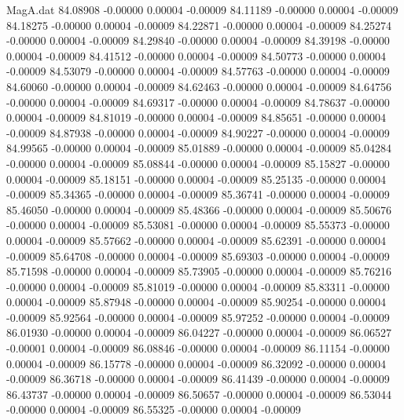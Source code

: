 \begin{filecontents}{MagA.dat}
  84.08908   -0.00000    0.00004   -0.00009
  84.11189   -0.00000    0.00004   -0.00009
  84.18275   -0.00000    0.00004   -0.00009
  84.22871   -0.00000    0.00004   -0.00009
  84.25274   -0.00000    0.00004   -0.00009
  84.29840   -0.00000    0.00004   -0.00009
  84.39198   -0.00000    0.00004   -0.00009
  84.41512   -0.00000    0.00004   -0.00009
  84.50773   -0.00000    0.00004   -0.00009
  84.53079   -0.00000    0.00004   -0.00009
  84.57763   -0.00000    0.00004   -0.00009
  84.60060   -0.00000    0.00004   -0.00009
  84.62463   -0.00000    0.00004   -0.00009
  84.64756   -0.00000    0.00004   -0.00009
  84.69317   -0.00000    0.00004   -0.00009
  84.78637   -0.00000    0.00004   -0.00009
  84.81019   -0.00000    0.00004   -0.00009
  84.85651   -0.00000    0.00004   -0.00009
  84.87938   -0.00000    0.00004   -0.00009
  84.90227   -0.00000    0.00004   -0.00009
  84.99565   -0.00000    0.00004   -0.00009
  85.01889   -0.00000    0.00004   -0.00009
  85.04284   -0.00000    0.00004   -0.00009
  85.08844   -0.00000    0.00004   -0.00009
  85.15827   -0.00000    0.00004   -0.00009
  85.18151   -0.00000    0.00004   -0.00009
  85.25135   -0.00000    0.00004   -0.00009
  85.34365   -0.00000    0.00004   -0.00009
  85.36741   -0.00000    0.00004   -0.00009
  85.46050   -0.00000    0.00004   -0.00009
  85.48366   -0.00000    0.00004   -0.00009
  85.50676   -0.00000    0.00004   -0.00009
  85.53081   -0.00000    0.00004   -0.00009
  85.55373   -0.00000    0.00004   -0.00009
  85.57662   -0.00000    0.00004   -0.00009
  85.62391   -0.00000    0.00004   -0.00009
  85.64708   -0.00000    0.00004   -0.00009
  85.69303   -0.00000    0.00004   -0.00009
  85.71598   -0.00000    0.00004   -0.00009
  85.73905   -0.00000    0.00004   -0.00009
  85.76216   -0.00000    0.00004   -0.00009
  85.81019   -0.00000    0.00004   -0.00009
  85.83311   -0.00000    0.00004   -0.00009
  85.87948   -0.00000    0.00004   -0.00009
  85.90254   -0.00000    0.00004   -0.00009
  85.92564   -0.00000    0.00004   -0.00009
  85.97252   -0.00000    0.00004   -0.00009
  86.01930   -0.00000    0.00004   -0.00009
  86.04227   -0.00000    0.00004   -0.00009
  86.06527   -0.00001    0.00004   -0.00009
  86.08846   -0.00000    0.00004   -0.00009
  86.11154   -0.00000    0.00004   -0.00009
  86.15778   -0.00000    0.00004   -0.00009
  86.32092   -0.00000    0.00004   -0.00009
  86.36718   -0.00000    0.00004   -0.00009
  86.41439   -0.00000    0.00004   -0.00009
  86.43737   -0.00000    0.00004   -0.00009
  86.50657   -0.00000    0.00004   -0.00009
  86.53044   -0.00000    0.00004   -0.00009
  86.55325   -0.00000    0.00004   -0.00009

\end{filecontents}
